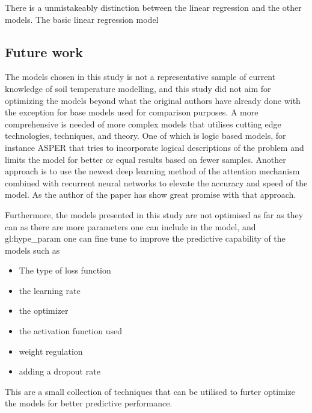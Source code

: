 There is a unmistakeably distinction between the linear regression and the other models. The basic linear regression model 

\subsection{Future work}

The models chosen in this study is not a representative sample of current knowledge of soil temperature modelling, and this study did not aim for optimizing the models beyond what the original authors have already done with the exception for base models used for comparison purposes. A more comprehensive is needed of more complex models that utilises cutting edge technologies, techniques, and theory. One of which is logic based models, for instance ASPER\cite{le_asper_2023} that tries to incorporate logical descriptions of the problem and limits the model for better or equal results based on fewer samples\cite{machot_bridging_2023}. Another approach is to use the newest deep learning method of the attention mechanism\cite{vaswani_attention_2017} combined with recurrent neural networks to elevate the accuracy and speed of the model. As the author of the paper \cite{li_attention-aware_2022} has show great promise with that approach.

Furthermore, the models presented in this study are not optimised as far as they can as there are more parameters one can include in the model, and \gls{gl:hype_param} one can fine tune to improve the predictive capability of the models such as
\begin{itemize}
	\item The type of loss function
	\item the learning rate
	\item the optimizer
	\item the activation function used
	\item weight regulation
	\item adding a dropout rate
\end{itemize}
This are a small collection of techniques that can be utilised to furter optimize the models for better predictive performance. 

